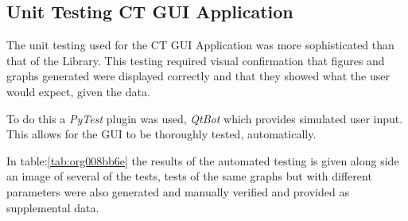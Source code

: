 \documentclass[11pt]{report}
\begin{document}
\clearpage

\subsection{Unit Testing CT GUI Application}
\label{sec:orge73bbc6}

The unit testing used for the CT GUI Application was more sophisticated than that of the Library. This testing required visual confirmation that figures and graphs generated were displayed correctly and that they showed what the user would expect, given the data.

To do this a \emph{PyTest} plugin was used, \emph{QtBot} which provides simulated user input. This allows for the GUI to be thoroughly tested, automatically.

In table:\ref{tab:org008bb6e} the results of the automated testing is given along side an image of several of the tests, tests of the same graphs but with different parameters were also generated and manually verified and provided as supplemental data.
\end{document}
